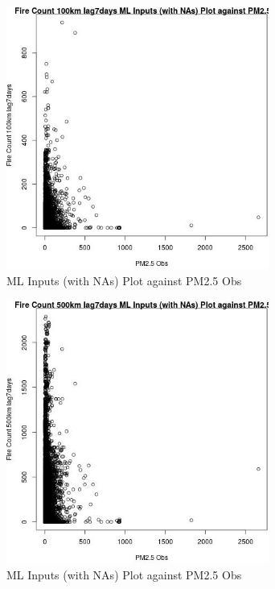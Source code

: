 \begin{figure} 
\centering  
\includegraphics[width=0.77\textwidth]{Code_Outputs/Report_ML_input_PM25_Step4_part_e_de_duplicated_aves_compiled_2019-05-21wNAs_Fire_Count_100km_lag7daysvPM25_Obs.jpg} 
\caption{\label{fig:Report_ML_input_PM25_Step4_part_e_de_duplicated_aves_compiled_2019-05-21wNAsFire_Count_100km_lag7daysvPM25_Obs}ML Inputs (with NAs) Plot against PM2.5 Obs} 
\end{figure} 
 

\begin{figure} 
\centering  
\includegraphics[width=0.77\textwidth]{Code_Outputs/Report_ML_input_PM25_Step4_part_e_de_duplicated_aves_compiled_2019-05-21wNAs_Fire_Count_500km_lag7daysvPM25_Obs.jpg} 
\caption{\label{fig:Report_ML_input_PM25_Step4_part_e_de_duplicated_aves_compiled_2019-05-21wNAsFire_Count_500km_lag7daysvPM25_Obs}ML Inputs (with NAs) Plot against PM2.5 Obs} 
\end{figure} 
 

